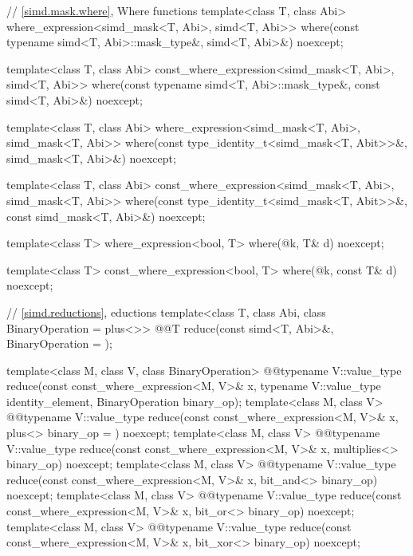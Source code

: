 \begin{codeblock}
{  // \ref{simd.mask.where}, Where functions
  template<class T, class Abi>
    where_expression<simd_mask<T, Abi>, simd<T, Abi>>
      where(const typename simd<T, Abi>::mask_type&, simd<T, Abi>&) noexcept;

  template<class T, class Abi>
    const_where_expression<simd_mask<T, Abi>, simd<T, Abi>>
      where(const typename simd<T, Abi>::mask_type&, const simd<T, Abi>&) noexcept;

  template<class T, class Abi>
    where_expression<simd_mask<T, Abi>, simd_mask<T, Abi>>
      where(const type_identity_t<simd_mask<T, Abit>>&, simd_mask<T, Abi>&) noexcept;

  template<class T, class Abi>
    const_where_expression<simd_mask<T, Abi>, simd_mask<T, Abi>>
      where(const type_identity_t<simd_mask<T, Abit>>&, const simd_mask<T, Abi>&) noexcept;

  template<class T>
    where_expression<bool, T>
      where(@\seebelow@ k, T& d) noexcept;

  template<class T>
    const_where_expression<bool, T>
      where(@\seebelow@ k, const T& d) noexcept;

  // \ref{simd.reductions}, eductions
  template<class T, class Abi, class BinaryOperation = plus<>>
    @@T reduce(const simd<T, Abi>&,
                       BinaryOperation = {});

  template<class M, class V, class BinaryOperation>
    @@typename V::value_type reduce(const const_where_expression<M, V>& x,
                                            typename V::value_type identity_element,
                                            BinaryOperation binary_op);
  template<class M, class V>
    @@typename V::value_type reduce(const const_where_expression<M, V>& x,
                                            plus<> binary_op = {}) noexcept;
  template<class M, class V>
    @@typename V::value_type reduce(const const_where_expression<M, V>& x,
                                            multiplies<> binary_op) noexcept;
  template<class M, class V>
    @@typename V::value_type reduce(const const_where_expression<M, V>& x,
                                            bit_and<> binary_op) noexcept;
  template<class M, class V>
    @@typename V::value_type reduce(const const_where_expression<M, V>& x,
                                            bit_or<> binary_op) noexcept;
  template<class M, class V>
    @@typename V::value_type reduce(const const_where_expression<M, V>& x,
                                            bit_xor<> binary_op) noexcept;

}
\end{codeblock}
